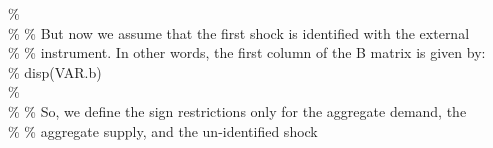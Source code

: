 \hspace{1mm}\hspace{5mm} \hspace{5mm} \hspace{5mm} \hspace{5mm} \textcolor{matlabgreen}{\%  }\\ 
\hspace{1mm}\hspace{5mm} \hspace{5mm} \hspace{5mm} \hspace{5mm} \textcolor{matlabgreen}{\% }\textcolor{matlabgreen}{\% But now we assume that the first shock is identified with the external  }\\ 
\hspace{1mm}\hspace{5mm} \hspace{5mm} \hspace{5mm} \hspace{5mm} \textcolor{matlabgreen}{\% }\textcolor{matlabgreen}{\% instrument. In other words, the first column of the B matrix is given by: }\\ 
\hspace{1mm}\hspace{5mm} \hspace{5mm} \hspace{5mm} \hspace{5mm} \textcolor{matlabgreen}{\% disp(VAR.b) }\\ 
\hspace{1mm}\hspace{5mm} \hspace{5mm} \hspace{5mm} \hspace{5mm} \textcolor{matlabgreen}{\%  }\\ 
\hspace{1mm}\hspace{5mm} \hspace{5mm} \hspace{5mm} \hspace{5mm} \textcolor{matlabgreen}{\% }\textcolor{matlabgreen}{\% So, we define the sign restrictions only \textcolor{matlabblue}{for} the aggregate demand, the  }\\ 
\hspace{1mm}\hspace{5mm} \hspace{5mm} \hspace{5mm} \hspace{5mm} \hspace{5mm} \textcolor{matlabgreen}{\% }\textcolor{matlabgreen}{\% aggregate supply, and the un-identified shock }\\ 
